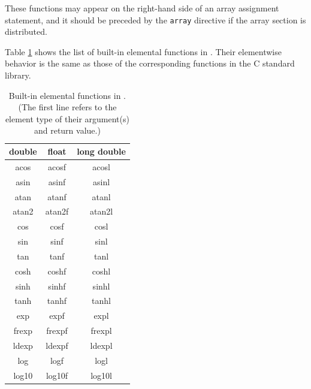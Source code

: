 These functions may appear on the right-hand side of an array
assignment statement, and it should be preceded by the {\tt array}
directive if the array section is distributed.

Table \ref{tab:elemental_c} shows the list of built-in elemental
functions in {\XMPC}. Their elementwise behavior is the same as those of
the corresponding functions in the C standard library.

\begin{table}[h]
 \caption[Built-in elemental functions in {\XMPC}]{Built-in elemental
 functions in {\XMPC}. (The first line refers to the element type of their
 argument(s) and return value.)}
 \label{tab:elemental_c}
 \begin{center}
 \begin{tabular}{c|c|c} \hline\hline
 double & float & long double \\ \hline
 acos & acosf & acosl \\
 asin & asinf & asinl \\
 atan & atanf & atanl \\
 atan2 & atan2f & atan2l \\
 cos & cosf & cosl \\
 sin & sinf & sinl \\
 tan & tanf & tanl \\

 cosh & coshf & coshl \\
 sinh & sinhf & sinhl \\
 tanh & tanhf & tanhl \\

 exp & expf & expl \\
 frexp & frexpf & frexpl \\
 ldexp & ldexpf & ldexpl \\
 log & logf & logl \\
 log10 & log10f & log10l \\


\end{tabular}
\end{center}
\end{table}
